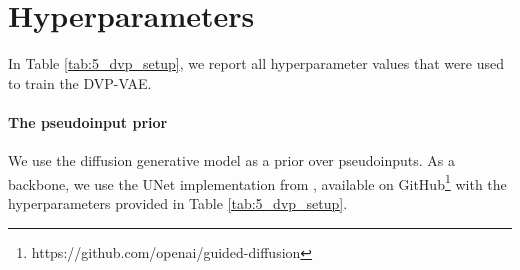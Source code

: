 \newpage
\section{Hyperparameters}\label{appendix:dvp_hyperparams}
In Table \ref{tab:5_dvp_setup}, we report all hyperparameter values that were used to train the DVP-VAE.

\paragraph{The pseudoinput prior}
We use the diffusion generative model as a prior over pseudoinputs. As a backbone, we use the UNet implementation from \citep{dhariwal2021diffusion}, available on GitHub\footnote{https://github.com/openai/guided-diffusion} with the hyperparameters provided in Table \ref{tab:5_dvp_setup}.

